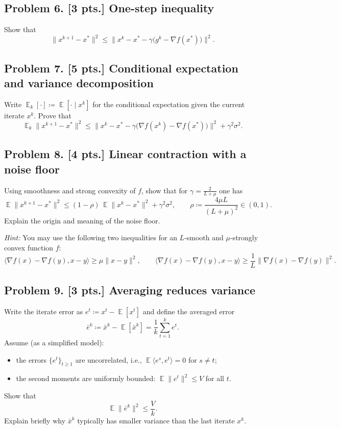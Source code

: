 \documentclass[11pt,a4paper]{article}
\DeclareMathOperator{\E}{\mathbb{E}}
\begin{document}
\subsection{Problem 6. [3 pts.] One-step inequality}
Show that
\[
\|x^{k+1} - x^{*}\|^{2} \le \bigl\| x^{k} - x^{*} - \gamma\bigl(g^{k} - \nabla f(x^{*})\bigr) \bigr\|^{2}.
\]

\subsection{Problem 7. [5 pts.] Conditional expectation and variance decomposition}
Write $\E_k[\cdot] \coloneqq \E[\cdot \mid x^{k}]$ for the conditional expectation given the current iterate $x^{k}$. Prove that
\[
\E_k \|x^{k+1} - x^{*}\|^{2} \le \bigl\| x^{k} - x^{*} - \gamma\bigl(\nabla f(x^{k}) - \nabla f(x^{*})\bigr) \bigr\|^{2} + \gamma^{2} \sigma^{2}.
\]

\subsection{Problem 8. [4 pts.] Linear contraction with a noise floor}
Using smoothness and strong convexity of $f$, show that for $\gamma = \frac{2}{L + \mu}$ one has
\[
\E \|x^{k+1} - x^{*}\|^{2} \le (1 - \rho)\, \E \|x^{k} - x^{*}\|^{2} + \gamma^{2} \sigma^{2}, \qquad \rho \coloneqq \frac{4\mu L}{(L + \mu)^{2}} \in (0, 1).
\]
Explain the origin and meaning of the noise floor.

\textit{Hint:} You may use the following two inequalities for an $L$-smooth and $\mu$-strongly convex function $f$:
\[
\langle \nabla f(x) - \nabla f(y), x - y \rangle \ge \mu \|x - y\|^{2},
\qquad
\langle \nabla f(x) - \nabla f(y), x - y \rangle \ge \frac{1}{L} \|\nabla f(x) - \nabla f(y)\|^{2}.
\]

\subsection{Problem 9. [3 pts.] Averaging reduces variance}
Write the iterate error as $e^{t} \coloneqq x^{t} - \E[x^{t}]$ and define the averaged error
\[
\bar{e}^{k} \coloneqq \bar{x}^{k} - \E[\bar{x}^{k}] = \frac{1}{k} \sum_{t=1}^{k} e^{t}.
\]
Assume (as a simplified model):
\begin{itemize}
    \item the errors $\{e^{t}\}_{t \ge 1}$ are uncorrelated, i.e., $\E\langle e^{s}, e^{t} \rangle = 0$ for $s \neq t$;
    \item the second moments are uniformly bounded: $\E\|e^{t}\|^{2} \le V$ for all $t$.
\end{itemize}
Show that
\[
\E\|\bar{e}^{k}\|^{2} \le \frac{V}{k}.
\]
Explain briefly why $\bar{x}^{k}$ typically has smaller variance than the last iterate $x^{k}$.
\end{document}
